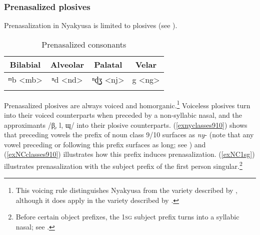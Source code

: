 \subsubsection{Prenasalized plosives}\label{PrenasalizedPlosives}
Prenasalization in Nyakyusa is limited to plosives (see ).
\label{NC-Clusters}
\begin{table}[H] %
	\centering
	\begin{tabular}{cccc}
		\lsptoprule
		{\footnotesize{Bilabial}}&		%
		{\footnotesize{Alveolar}} & 		%
		{\footnotesize{Palatal}} & 		%
		{\footnotesize{Velar}} 	 \\		%
		\midrule
		ᵐb <mb> & ⁿd <nd> & ⁿd͜ʒ <nj> & {\ᵑ}g <ng> \\
		\lspbottomrule
		
	\end{tabular}	
	\caption{Prenasalized consonants}	
	\label{tabPrenasalizedConsonants} 
\end{table}
Prenasalized plosives are always voiced and homorganic.\footnote{This voicing rule distinguishes Nyakyusa from the  variety described by \citet[278]{LabroussiC1998}, although it does apply in the variety described by \citet{KishindoP1999}.} Voiceless plosives turn into their voiced counterparts when preceded by a non-syllabic nasal, and the approximants /β̞, l, ɰ/ into their plosive counterparts. (\ref{exnyclasses910}) shows that preceding vowels the prefix of noun class 9/10 surfaces as \textit{ny}- (note that any vowel preceding or following this prefix surfaces as long; see ) and (\ref{exNCclasses910}) illustrates how this prefix induces prenasalization.  (\ref{exNC1sg}) illustrates prenasalization with the subject prefix of the first person singular.\footnote{Before certain object prefixes, the \textsc{1sg} subject prefix turns into a syllabic nasal; see .}
